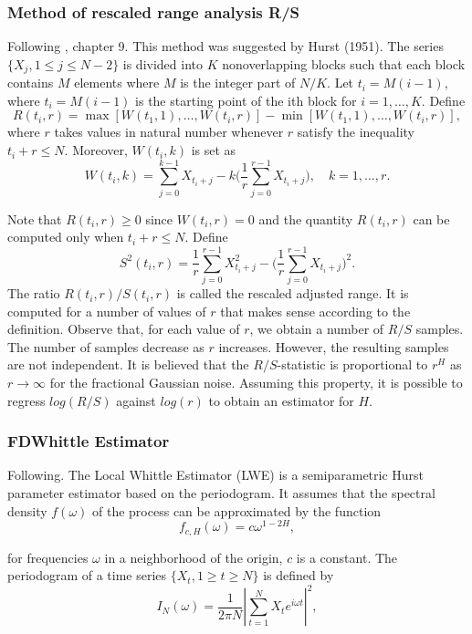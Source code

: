 \documentclass[smallextended]{svjour3}
\newcounter{chapter} %
\begin{document}
\subsubsection{Method of rescaled range analysis R/S}
Following \cite{ra}, chapter 9.
This method was suggested by Hurst (1951). The series $\{X_j , 1 \le j \le N -
2\}$ is
divided into $K$ nonoverlapping blocks such that each block contains $M$
elements
where $M$ is the integer part of $N/K$. Let $t_i = M(i - 1)$, where $t_i = M(i
- 1)$ is the starting point of the ith
block for $i = 1,\ldots, K$. Define
$$
R(t_i,r) = \max[W(t_1 , 1), \ldots, W(t_i , r)] - \min[W (t_1 , 1),  \ldots , W
(t_i , r)],
$$
where $r$ takes values in natural number whenever $r$ satisfy the inequality
$t_i + r \le N$. Moreover, $ W (t_i , k) $ is set as
\[
W (t_i , k) = \sum_{j=0}^{k-1} X_{t_i +j}  - k
\Bigg(\frac{1}{r}\sum_{j=0}^{r-1} X_{t_i +j}  \Bigg),\quad k = 1,\ldots , r.
\]

Note that $R(t_i, r) \ge 0$ since $W(t_i , r) = 0$ and the quantity $R(t_i ,
r)$ can be computed only when $t_i + r \le N$. Define
\[
S^2 (t_i , r) = \frac{1}{r} \sum_{j=0}^{r-1} X_{t_i +j}^2  -
\Bigg(\frac{1}{r}\sum_{j=0}^{r-1} X_{t_i +j}  \Bigg)^2.
\]
The ratio $R(t_i , r)/S(t_i , r)$ is called the rescaled adjusted range. It is
computed
for a number of values of $r$ that makes sense according to the definition.
Observe that, for each value of $r$, we obtain a number of $R/S$ samples. The
number of samples decrease as $r$ increases. However, the resulting samples are
not independent. It is believed that the $R/S$-statistic is
proportional to $r^H$ as $r \rightarrow \infty$ for the fractional Gaussian
noise. Assuming this
property, it is possible to regress $log(R/S)$ against $log(r)$ to obtain an
estimator for $H$.




\subsubsection{FDWhittle Estimator}

Following\cite{pa-etal}. The Local Whittle Estimator (LWE) is a semiparametric
Hurst parameter estimator based on the periodogram.
It assumes that the spectral density $f(\omega)$ of the process can be
approximated by the function
\begin{equation}\label{fdw1}
f_{c,H}(\omega) = c\omega^{1-2H},
\end{equation}

for frequencies $\omega$ in a neighborhood of the origin, $c$ is a constant.
The periodogram of a time series
$\{X_t , 1 \ge t \ge N \}$ is defined by
$$
I_N (\omega)  = \frac{1}{2\pi N}\left| \sum_{t=1}^N X_te^{i\omega t}\right|^2,
$$
\end{document}

